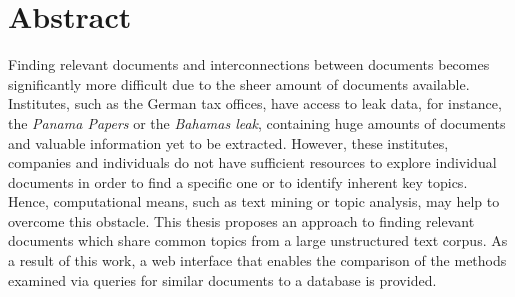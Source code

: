 \chapter*{Abstract}

Finding relevant documents and interconnections between documents becomes significantly more difficult due to the sheer amount of documents available.
Institutes, such as the German tax offices, have access to leak data, for instance, the \textit{Panama Papers} or the \textit{Bahamas leak}, 
containing huge amounts of documents and valuable information yet to be extracted.
However, these institutes, companies and individuals do not have sufficient resources to explore individual documents 
in order to find a specific one or to identify inherent key topics.
Hence, computational means, such as text mining or topic analysis, may help to overcome this obstacle.
This thesis proposes an approach to finding relevant documents which share common topics from a large unstructured text corpus.
As a result of this work, a web interface that enables the comparison of the methods examined via queries for similar documents to a database is provided. 